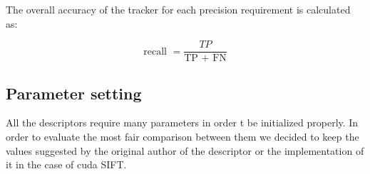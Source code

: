 The overall accuracy of the tracker for each precision requirement is calculated as:

\begin{equation}
\text{recall } = \frac{TP}{\text{TP } + \text{ FN}}
\end{equation}


\subsection{Parameter setting}

All the descriptors require many parameters in order t be initialized properly. In order to evaluate the most fair comparison between them we decided to keep the values suggested by the original author of the descriptor or the implementation of it in the case of cuda SIFT.



